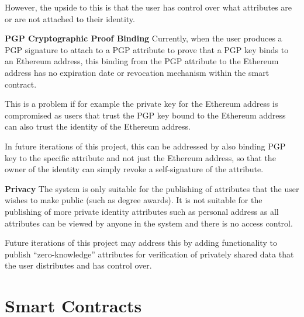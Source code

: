 \documentclass[12pt]{report}
\begin{document}
	However, the upside to this is that the user has control over what attributes are or are not attached to their identity.
	
	\bigskip
	\noindent \textbf{PGP Cryptographic Proof Binding}\newline
	Currently, when the user produces a PGP signature to attach to a PGP attribute to prove that a PGP key binds to an Ethereum address, this binding from the PGP attribute to the Ethereum address has no expiration date or revocation mechanism within the smart contract.
	
	This is a problem if for example the private key for the Ethereum address is compromised as users that trust the PGP key bound to the Ethereum address can also trust the identity of the Ethereum address.
	
	In future iterations of this project, this can be addressed by also binding PGP key to the specific attribute and not just the Ethereum address, so that the owner of the identity can simply revoke a self-signature of the attribute.
	
	\bigskip
	\noindent \textbf{Privacy}\newline
	The system is only suitable for the publishing of attributes that the user wishes to make public (such as degree awards). It is not suitable for the publishing of more private identity attributes such as personal address as all attributes can be viewed by anyone in the system and there is no access control.
	
	Future iterations of this project may address this by adding functionality to publish ``zero-knowledge'' attributes for verification of privately shared data that the user distributes and has control over.
	
	
	
	
	\appendix
	\chapter{Smart Contracts}
\end{document}
